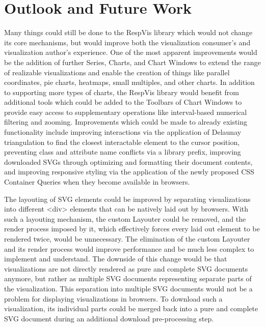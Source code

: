 \chapter{Outlook and Future Work}
\label{chap:Outlook}

Many things could still be done to the RespVis library which would not
change its core mechanisms, but would improve both the visualization
consumer's and visualization author's experience. One of the most
apparent improvements would be the addition of further Series, Charts,
and Chart Windows to extend the range of realizable visualizations and
enable the creation of things like parallel coordinates, pie charts,
heatmaps, small multiples, and other charts. In addition to supporting
more types of charts, the RespVis library would benefit from
additional tools which could be added to the Toolbars of Chart Windows
to provide easy access to supplementary operations like interval-based
numerical filtering and zooming.
%
Improvements which could be made to already existing functionality
include improving interactions via the application of Delaunay
triangulation \parencite{Delaunay,DelaunayAlgorithms} to find the
closest interactable element to the cursor position, preventing class
and  attribute name conflicts via a library prefix,
improving downloaded SVGs through optimizing and formatting their
document contents, and improving responsive styling via the
application of the newly proposed CSS Container Queries
\parencite{CSSContainment3} when they become available in browsers.

The layouting of SVG elements could be improved by separating
visualizations into different <div> elements that can be natively laid
out by browsers. With such a layouting mechanism, the custom Layouter
could be removed, and the render process imposed by it, which
effectively forces every laid out element to be rendered twice, would
be unnecessary. The elimination of the custom Layouter and its render
process would improve performance and be much less complex to
implement and understand. The downside of this change would be that
visualizations are not directly rendered as pure and complete SVG
documents anymore, but rather as multiple SVG documents representing
separate parts of the visualization. This separation into multiple SVG
documents would not be a problem for displaying visualizations in
browsers. To download such a visualization, its individual parts could
be merged back into a pure and complete SVG document during an
additional download pre-processing step.

